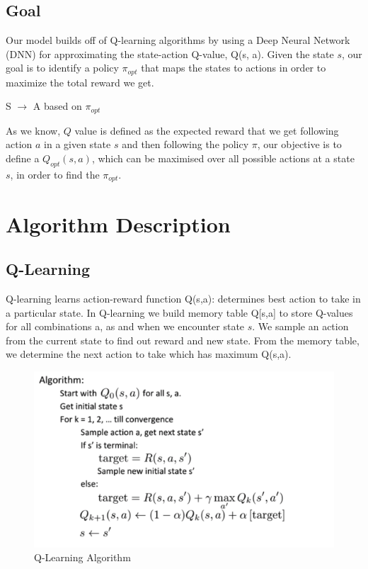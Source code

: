\subsection{Goal}

Our model builds off of Q-learning algorithms by using a Deep Neural Network (DNN) for approximating the state-action Q-value, Q(s, a). 
Given the state $s$, our goal is to identify a policy $\pi_{opt}$ that maps the states to actions in order to maximize the total reward we get.

\begin{center}
S $\rightarrow$ A based on $\pi_{opt}$
\end{center}

As we know, $Q$ value is defined as the expected reward that we get following action $a$ in a given state $s$ and then following the policy $\pi$, our objective is to define a $Q_{opt} (s, a)$, which can be maximised over all possible actions at a state $s$, in order to find the $\pi_{opt}$.

\section{Algorithm Description}

\subsection{Q-Learning}
Q-learning learns action-reward function Q(s,a): determines best action to take in a particular state. In Q-learning we build memory table Q[s,a] to store Q-values for all combinations a, as and when we encounter state $s$. We sample an action from the current state to find out reward  and new state. From the memory table, we determine the next action to take which has maximum Q(s,a).

\begin{figure}%
\centering
\includegraphics[width=0.6\columnwidth]{figures/Q-learning.png}%
\caption{Q-Learning Algorithm}%
\label{fig:datastats}%
\end{figure}


